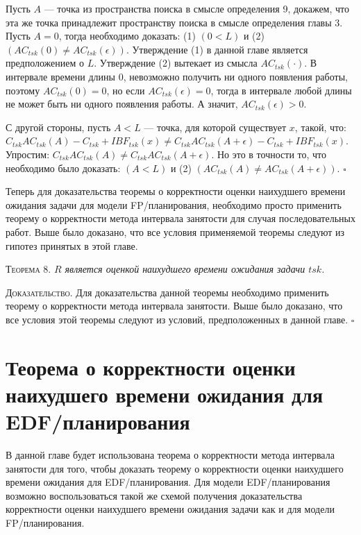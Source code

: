   Пусть $A$ --- точка из пространства поиска в смысле определения 9, докажем, что
    эта же точка принадлежит пространству поиска в смысле определения главы 3.
   Пусть $A = 0$, тогда необходимо доказать:
     (1) $(0 < L)$ и (2) $(AC_{tsk}(0) \neq AC_{tsk}(\epsilon))$.
   Утверждение (1) в данной главе является предположением о $L$.
   Утверждение (2) вытекает из смысла $AC_{tsk}(\cdot)$. В интервале времени длины 0,
     невозможно получить ни одного появления работы, поэтому $AC_{tsk}(0) = 0$,
     но если $AC_{tsk}(\epsilon) = 0$, тогда в интервале любой длины не может
     быть ни одного появления работы. А значит, $AC_{tsk}(\epsilon) > 0$.

   С другой стороны, пусть $A < L$ --- точка, для которой существует $x$, такой, что:
     $C_{tsk}AC_{tsk}(A) - C_{tsk} + IBF_{tsk}(x) \neq C_{tsk}AC_{tsk}(A + \epsilon) - C_{tsk} + IBF_{tsk}(x)$.
   Упростим: $C_{tsk}AC_{tsk}(A) \neq C_{tsk}AC_{tsk}(A + \epsilon)$.
   Но это в точности то, что необходимо было доказать: $(A < L)$ и (2) $(AC_{tsk}(A) \neq AC_{tsk}(A + \epsilon))$.
$\square$


Теперь для доказательства теоремы о корректности оценки наихудшего времени
  ожидания задачи для модели FP\-/планирования, необходимо просто применить теорему
  о корректности метода интервала занятости для случая последовательных работ.
  Выше было доказано, что все условия применяемой теоремы следуют из
  гипотез принятых в этой главе.

\textsc{Теорема 8.}
\textit{$R$ является оценкой наихудшего времени ожидания задачи $tsk$. }

\textsc{Доказательство.}
  Для доказательства данной теоремы необходимо применить теорему о корректности метода
    интервала занятости. Выше было доказано, что все условия этой теоремы следуют
    из условий, предположенных в данной главе.
$\square$



\section{Теорема о корректности оценки наихудшего времени ожидания для EDF\-/планирования}

В данной главе будет использована теорема о корректности метода интервала занятости
  для того, чтобы доказать теорему о корректности оценки наихудшего времени ожидания
  для EDF\-/планирования. Для модели EDF\-/планирования возможно воспользоваться такой же схемой получения
  доказательства корректности оценки наихудшего времени ожидания задачи как и для модели FP\-/планирования.

